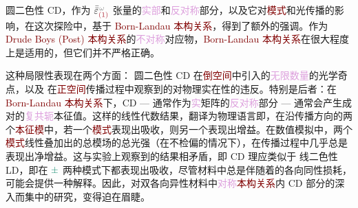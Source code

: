 \textcolor{NavyBlue}{圆二色性 CD}，作为 $\bar{\bar{\varepsilon}}^{\;\! \mathcolor{gray}{\omega}}_{\textcolor{Maroon}{(1)}}$ 张量的\textcolor{Plum}{实部}和\textcolor{Plum}{反对称}部分，以及它对\textcolor{Maroon}{模式}和光传播的影响，在这次探险中，基于 \textcolor{Maroon}{Born-Landau} \textcolor{Maroon}{本构关系}，得到了额外的强调。作为 \textcolor{Maroon}{Drude Boys (Post)} \textcolor{Maroon}{本构关系}的\textcolor{Plum}{不对称}对应物，\textcolor{Maroon}{Born-Landau} \textcolor{Maroon}{本构关系}在很大程度上是适用的，但它们并不严格正确\cite{frantaConstitutiveEquationsDescribing2021,ossikovskiConstitutiveRelationsOptically2021}。

这种局限性表现在两个方面：{\one} \textcolor{NavyBlue}{圆二色性 CD} 在\textcolor{Maroon}{倒空间}中引入的\textcolor{Plum}{无限数量}的\textcolor{PineGreen}{光学奇点}，以及 {\two} 在\textcolor{Maroon}{正空间}传播过程中观察到的对\textcolor{NavyBlue}{物理实在性}的违反。特别是后者：在 \textcolor{Maroon}{Born-Landau} \textcolor{Maroon}{本构关系}下，\textcolor{NavyBlue}{CD} --- 通常作为\textcolor{Plum}{实}矩阵的\textcolor{Plum}{反对称}部分 --- 通常会产生成对的\textcolor{Plum}{复共轭}\textcolor{PineGreen}{本征值}。这样的线性代数结果，翻译为\textcolor{NavyBlue}{物理语言}即，在沿传播方向的两个\textcolor{Maroon}{本征模}中，若一个\textcolor{Maroon}{模式}表现出\textcolor{NavyBlue}{吸收}，则另一个表现出\textcolor{NavyBlue}{增益}。在数值模拟中，两个\textcolor{Maroon}{模式}\textcolor{PineGreen}{线性叠加}出的\textcolor{PineGreen}{总模场}的\textcolor{NavyBlue}{总光强}（在不\textcolor{PineGreen}{检偏}的情况下），在传播过程中几乎总是表现出\textcolor{NavyBlue}{净增益}。这与实验上观察到的结果相矛盾，即 \textcolor{NavyBlue}{CD} 理应类似于 \textcolor{NavyBlue}{线二色性 LD}，即在 $\textcolor{PineGreen}{\pm}$ 两种模式\cite{multunasCircularDichroismCrystals2023}下都表现出\textcolor{NavyBlue}{吸收}，尽管材料中总是伴随着的各向同性\textcolor{NavyBlue}{损耗}，可能会提供一种解释。因此，对\textcolor{PineGreen}{双各向异性}材料中\textcolor{Plum}{对称}\textcolor{Maroon}{本构关系}内 \textcolor{NavyBlue}{CD} 部分的深入而集中的研究，变得迫在眉睫。

